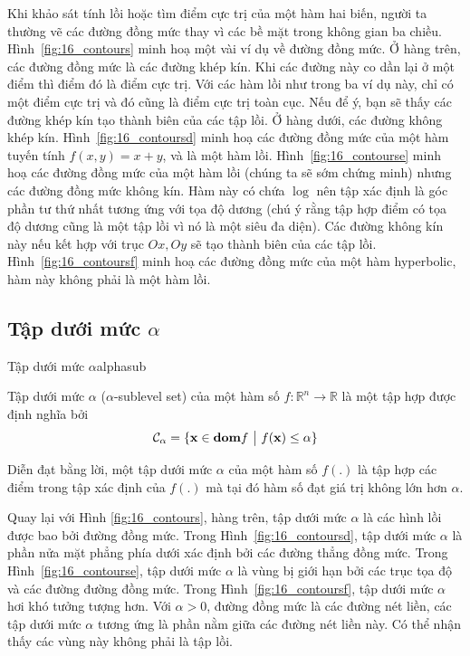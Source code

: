 Khi khảo sát tính lồi hoặc tìm điểm cực trị của một hàm hai biến,
người ta thường vẽ các đường đồng mức thay vì các bề mặt trong không gian ba chiều.
Hình~\ref{fig:16_contours} minh hoạ một vài ví dụ về đường đồng mức. Ở hàng trên,
các đường đồng mức là các đường khép kín. Khi các đường này co dần lại ở một điểm thì điểm đó là điểm cực trị. Với các hàm
lồi như trong ba ví dụ này, chỉ có một điểm cực trị và đó cũng là điểm cực trị toàn cục. Nếu để ý, bạn sẽ thấy các
đường khép kín tạo thành biên của các {tập lồi}. Ở hàng dưới, các đường
không khép kín. Hình~\ref{fig:16_contoursd} minh hoạ các đường đồng mức của một
hàm tuyến tính $f(x, y) = x + y$, và là một hàm lồi.
Hình~\ref{fig:16_contourse} minh hoạ các đường đồng mức của một hàm lồi (chúng
ta sẽ sớm chứng minh) nhưng các đường đồng mức không kín.
Hàm này có chứa $\log$ nên tập xác định là góc phần tư thứ nhất tương ứng với tọa độ dương (chú ý rằng tập hợp điểm có tọa độ dương cũng là một
{tập lồi} vì nó là một siêu đa diện). Các {đường không kín} này nếu
kết hợp với trục $Ox, Oy$ sẽ tạo thành biên của các {tập lồi}.
Hình~\ref{fig:16_contoursf} minh hoạ các đường đồng mức của một hàm hyperbolic, hàm
này không phải là một hàm lồi.
 
\subsection{Tập dưới mức $\alpha$}

\begin{mydef}{Tập dưới mức $\alpha$}{alphasub}
    
 Tập dưới mức $\alpha$ ($\alpha$-sublevel set) của một hàm số $f : \mathbb{R}^n \rightarrow
 \mathbb{R}$ là một tập hợp được định nghĩa bởi
\begin{equation*} 
\mathcal{C}_{\alpha} = \{\mathbf{x} \in \text{\bf dom} f ~\big|~ f(\mathbf{x}) \leq \alpha\} 
\end{equation*} 
\end{mydef}
Diễn đạt bằng lời, một tập dưới mức $\alpha$ của một hàm số $f(.)$ là tập hợp các
điểm trong tập xác định của $f(.)$ mà tại đó hàm số đạt giá trị không lớn hơn
$\alpha$.
 
 
Quay lại với Hình \ref{fig:16_contours}, hàng trên, tập dưới mức $\alpha$ là các hình lồi được bao bởi đường đồng mức. Trong Hình~\ref{fig:16_contoursd}, tập dưới mức $\alpha$ là phần nửa mặt phẳng phía dưới xác định bởi
các đường thẳng đồng mức. Trong Hình~\ref{fig:16_contourse}, tập dưới mức $\alpha$ là vùng bị giới hạn bởi các trục tọa độ và các đường đường đồng mức. Trong
Hình~\ref{fig:16_contoursf}, tập dưới mức $\alpha$ hơi khó tưởng tượng hơn. Với $\alpha > 0$, đường đồng mức là các đường nét liền, các tập dưới mức
$\alpha$ tương ứng là phần nằm giữa các đường nét liền này. Có thể
nhận thấy các vùng này không phải là tập lồi.


